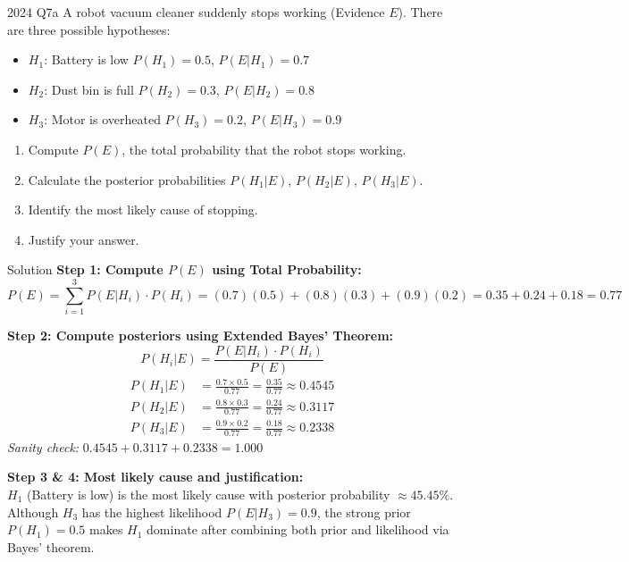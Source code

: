 \documentclass[12pt,a4paper]{article}
\begin{document}
\begin{qbox}{2024 Q7a}
A robot vacuum cleaner suddenly stops working (Evidence $E$). There are three possible hypotheses:
\begin{itemize}[noitemsep]
  \item $H_1$: Battery is low \quad $P(H_1)=0.5$, \quad $P(E|H_1)=0.7$
  \item $H_2$: Dust bin is full \quad $P(H_2)=0.3$, \quad $P(E|H_2)=0.8$
  \item $H_3$: Motor is overheated \quad $P(H_3)=0.2$, \quad $P(E|H_3)=0.9$
\end{itemize}
\begin{enumerate}
  \item Compute $P(E)$, the total probability that the robot stops working.
  \item Calculate the posterior probabilities $P(H_1|E)$, $P(H_2|E)$, $P(H_3|E)$.
  \item Identify the most likely cause of stopping.
  \item Justify your answer.
\end{enumerate}
\end{qbox}

\begin{solbox}{Solution}
\textbf{Step 1: Compute $P(E)$ using Total Probability:}
\[
P(E) = \sum_{i=1}^{3} P(E|H_i)\cdot P(H_i)
     = (0.7)(0.5) + (0.8)(0.3) + (0.9)(0.2)
     = 0.35 + 0.24 + 0.18 = \boxed{0.77}
\]

\textbf{Step 2: Compute posteriors using Extended Bayes' Theorem:}
\[
P(H_i|E) = \frac{P(E|H_i)\cdot P(H_i)}{P(E)}
\]
\begin{align*}
P(H_1|E) &= \frac{0.7 \times 0.5}{0.77} = \frac{0.35}{0.77} \approx \boxed{0.4545}\\[4pt]
P(H_2|E) &= \frac{0.8 \times 0.3}{0.77} = \frac{0.24}{0.77} \approx \boxed{0.3117}\\[4pt]
P(H_3|E) &= \frac{0.9 \times 0.2}{0.77} = \frac{0.18}{0.77} \approx \boxed{0.2338}
\end{align*}
\textit{Sanity check:} $0.4545 + 0.3117 + 0.2338 = 1.000$ \checkmark

\textbf{Step 3 \& 4: Most likely cause and justification:}\\
$H_1$ (Battery is low) is the most likely cause with posterior probability $\approx 45.45\%$.\\
Although $H_3$ has the highest likelihood $P(E|H_3)=0.9$, the strong prior $P(H_1)=0.5$ makes $H_1$ dominate after combining both prior and likelihood via Bayes' theorem.
\end{solbox}
\end{document}
